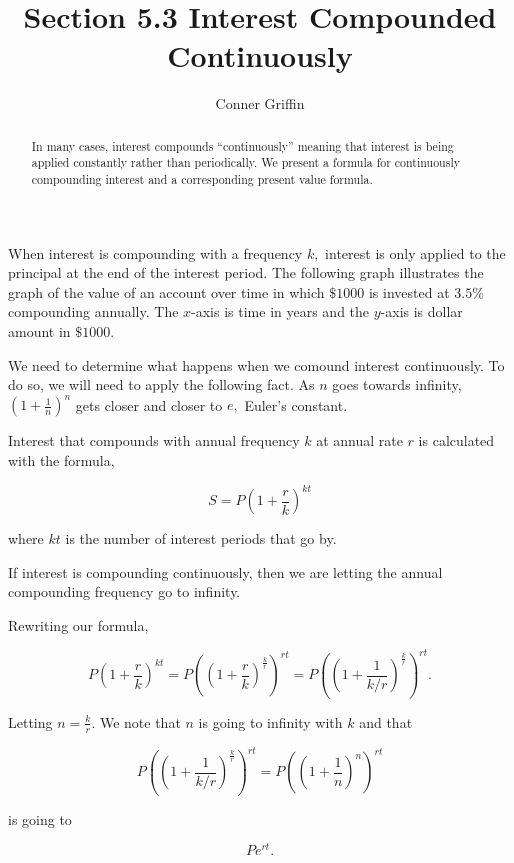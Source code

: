 \documentclass{ximera}
\title{Section 5.3 Interest Compounded Continuously}
\author{Conner Griffin}
\begin{document}
\begin{abstract}
    In many cases, interest compounds ``continuously'' meaning that interest is being applied constantly rather than periodically. We present a formula for continuously compounding interest and a corresponding present value formula.
\end{abstract}
\maketitle

When interest is compounding with a frequency \(k,\) interest is only applied to the principal at the end of the interest period. The following graph illustrates the graph of the value of an account over time in which \(\$1000\) is invested at \(3.5\%\) compounding annually. The \(x\)-axis is time in years and the \(y\)-axis is dollar amount in \(\$1000.\)


We need to determine what happens when we comound interest continuously. To do so, we will need to apply the following fact. As \(n\) goes towards infinity, \(\left(1+\frac{1}{n}\right)^n\) gets closer and closer to \(e,\) Euler's constant.


Interest that compounds with annual frequency \(k\) at annual rate \(r\) is calculated with the formula,

\[S= P\left(1+\frac{r}{k}\right)^{kt}\]

where \(kt\) is the number of interest periods that go by.

If interest is compounding continuously, then we are letting the annual compounding frequency go to infinity.

Rewriting our formula,

\[P\left(1+\frac{r}{k}\right)^{kt} = P\left(\left(1+\frac{r}{k}\right)^{\frac{k}{r}}\right)^{rt} = P\left(\left(1+\frac{1}{k/r}\right)^{\frac{k}{r}}\right)^{rt}.\]

Letting \(n=\frac{k}{r}.\) We note that \(n\) is going to infinity with \(k\) and that

\[P\left(\left(1+\frac{1}{k/r}\right)^{\frac{k}{r}}\right)^{rt}=P\left(\left(1+\frac{1}{n}\right)^{n}\right)^{rt}\]

is going to 

\[Pe^{rt}.\]







\end{document}
